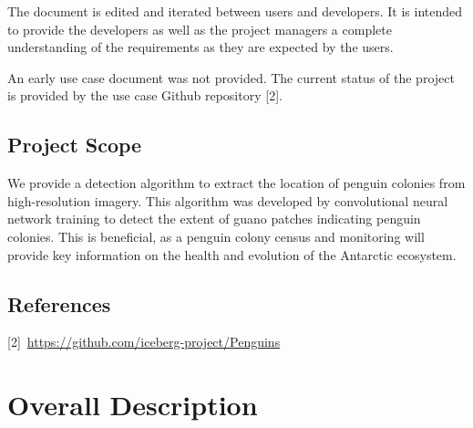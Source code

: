 \documentclass{scrreprt}
\begin{document}
The document is edited and iterated between users and developers. It is intended
to provide the developers as well as the project managers a complete understanding 
of the requirements as they are expected by the users.

An early use case document was not provided. The current status of the project 
is provided by the use case Github repository [2].

\section{Project Scope}
\iffalse
$<$Provide a short description of the software being specified and its purpose, 
including relevant benefits, objectives, and goals. Relate the software to 
corporate goals or business strategies. If a separate vision and scope document 
is available, refer to it rather than duplicating its contents here.$>$
\fi

We provide a detection algorithm to extract the location of penguin colonies from high-resolution 
imagery. This algorithm was developed by convolutional neural network training to 
detect the extent of guano patches indicating penguin colonies. This is beneficial, as a penguin colony census and monitoring will provide key information on the health and evolution 
of the Antarctic ecosystem.


\section{References}
[2]~\url{https://github.com/iceberg-project/Penguins}


\chapter{Overall Description}
\end{document}
